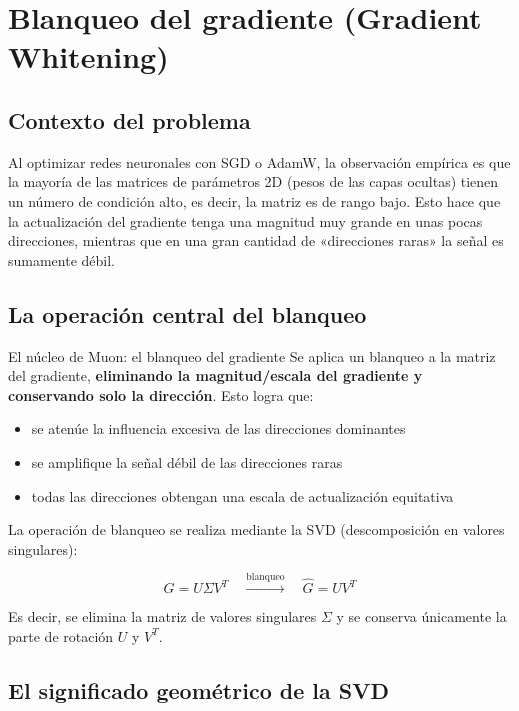 \documentclass[a4paper]{article}
\begin{document}
\section{Blanqueo del gradiente (Gradient Whitening)}

\subsection{Contexto del problema}

Al optimizar redes neuronales con SGD o AdamW, la observación empírica es que la mayoría de las matrices de parámetros 2D (pesos de las capas ocultas) tienen un número de condición alto, es decir, la matriz es de rango bajo. Esto hace que la actualización del gradiente tenga una magnitud muy grande en unas pocas direcciones, mientras que en una gran cantidad de «direcciones raras» la señal es sumamente débil.

\subsection{La operación central del blanqueo}

\begin{importantbox}{El núcleo de Muon: el blanqueo del gradiente}
Se aplica un blanqueo a la matriz del gradiente, \textbf{eliminando la magnitud/escala del gradiente y conservando solo la dirección}. Esto logra que:
\begin{itemize}
  \item se atenúe la influencia excesiva de las direcciones dominantes
  \item se amplifique la señal débil de las direcciones raras
  \item todas las direcciones obtengan una escala de actualización equitativa
\end{itemize}
\end{importantbox}

La operación de blanqueo se realiza mediante la SVD (descomposición en valores singulares):

$$
G = U \Sigma V^T \quad \xrightarrow{\text{blanqueo}} \quad \hat{G} = U V^T
$$

Es decir, se elimina la matriz de valores singulares $\Sigma$ y se conserva únicamente la parte de rotación $U$ y $V^T$.

\subsection{El significado geométrico de la SVD}
\end{document}
